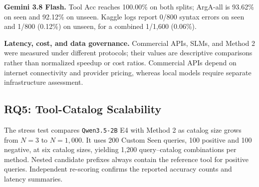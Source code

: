 \documentclass[10pt,twocolumn,a4paper]{article}
\begin{document}
\textbf{Gemini 3.8 Flash.} Tool Acc reaches 100.00\% on both splits; ArgA-all is 93.62\% on seen and 92.12\% on unseen. Kaggle logs report 0/800 syntax errors on seen and 1/800 (0.12\%) on unseen, for a combined 1/1,600 (0.06\%).

\textbf{Latency, cost, and data governance.} Commercial APIs, SLMs, and Method 2 were measured under different protocols; their values are descriptive comparisons rather than normalized speedup or cost ratios. Commercial APIs depend on internet connectivity and provider pricing, whereas local models require separate infrastructure assessment.

\subsection{RQ5: Tool-Catalog Scalability}
The stress test compares \texttt{Qwen3.5-2B} E4 with Method 2 as catalog size grows from $N=3$ to $N=1{,}000$. It uses 200 Custom Seen queries, 100 positive and 100 negative, at six catalog sizes, yielding 1,200 query--catalog combinations per method. Nested candidate prefixes always contain the reference tool for positive queries. Independent re-scoring confirms the reported accuracy counts and latency summaries.
\end{document}
